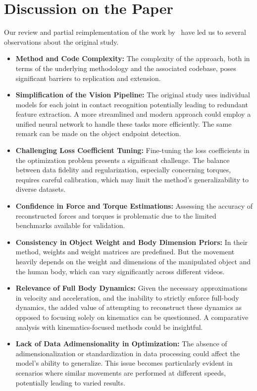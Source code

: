 \section{Discussion on the Paper}
\label{sec:discussion}

Our review and partial reimplementation of the work by~\citet{li2019estimating} have led us to several observations about 
the original study.

\begin{itemize}
    \item \textbf{Method and Code Complexity:} The complexity of the approach, both in terms of the underlying methodology and the associated 
    codebase, poses significant barriers to replication and extension.

    \item \textbf{Simplification of the Vision Pipeline:} The original study uses individual models for each joint in contact recognition
    potentially leading to redundant feature extraction. A more streamlined and modern approach could employ a unified neural network to handle 
    these tasks more efficiently. The same remark can be made on the object endpoint detection.

    \item \textbf{Challenging Loss Coefficient Tuning:} Fine-tuning the loss coefficients in the optimization problem presents a significant 
    challenge. The balance between data fidelity and regularization, especially concerning torques, requires careful calibration, which may 
    limit the method's generalizability to diverse datasets. 

    \item \textbf{Confidence in Force and Torque Estimations:} Assessing the accuracy of reconstructed forces and torques is problematic due 
    to the limited benchmarks available for validation.

    \item \textbf{Consistency in Object Weight and Body Dimension Priors:} In their method, weights and weight matrices are predefined. 
    But the movement heavily depends on the weight and dimensions of the manipulated object and the human body, which can vary significantly 
    across different videos. 

    \item \textbf{Relevance of Full Body Dynamics:} Given the necessary approximations in velocity and acceleration, and the inability to 
    strictly enforce full-body dynamics, the added value of attempting to reconstruct these dynamics as opposed to focusing 
    solely on kinematics can be questionned. A comparative analysis with kinematics-focused methods could be insightful.

    \item \textbf{Lack of Data Adimensionality in Optimization:} The absence of adimensionalization or standardization in data processing could 
    affect the model's ability to generalize. This issue becomes particularly evident in scenarios where similar movements are performed at 
    different speeds, potentially leading to varied results.

\end{itemize}